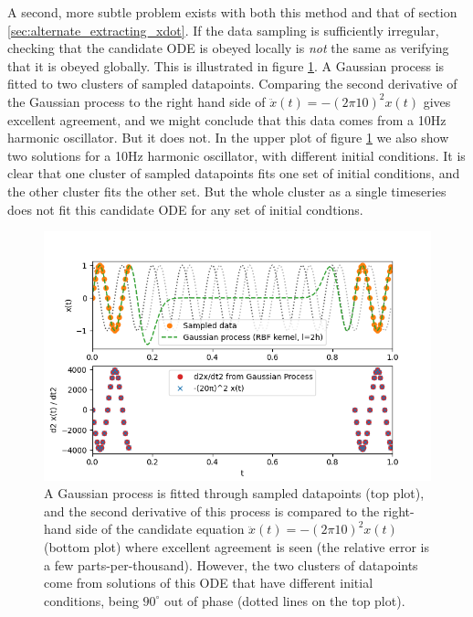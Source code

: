 \documentclass{article}
\begin{document}
A second, more subtle problem exists with both this method and that of section \ref{sec:alternate_extracting_xdot}. If the data sampling is sufficiently irregular, checking that the candidate ODE is obeyed locally is \emph{not} the same as verifying that it is obeyed globally.
This is illustrated in figure \ref{fig:gp_fitting}.
A Gaussian process is fitted to two clusters of sampled datapoints.
Comparing the second derivative of the Gaussian process to the right hand side of $\ddot{x}(t) = -(2\pi10)^2 x(t)$ gives excellent agreement, and we might conclude that this data comes from a 10Hz harmonic oscillator.
But it does not.
In the upper plot of figure \ref{fig:gp_fitting} we also show two solutions for a 10Hz harmonic oscillator, with different initial conditions.
It is clear that one cluster of sampled datapoints fits one set of initial conditions, and the other cluster fits the other set.
But the whole cluster as a single timeseries does not fit this candidate ODE for any set of initial condtions.

\begin{figure}
\includegraphics{images/alternative_methods/gp_fitting.png}
\centering
\caption{A Gaussian process is fitted through sampled datapoints (top plot), and the second derivative of this process is compared to the right-hand side of the candidate equation $\ddot{x}(t) = -(2\pi10)^2 x(t)$ (bottom plot) where excellent agreement is seen (the relative error is a few parts-per-thousand).
However, the two clusters of datapoints come from solutions of this ODE that have different initial conditions, being $90^{\circ}$ out of phase (dotted lines on the top plot).
}
\label{fig:gp_fitting}
\end{figure}
\end{document}
